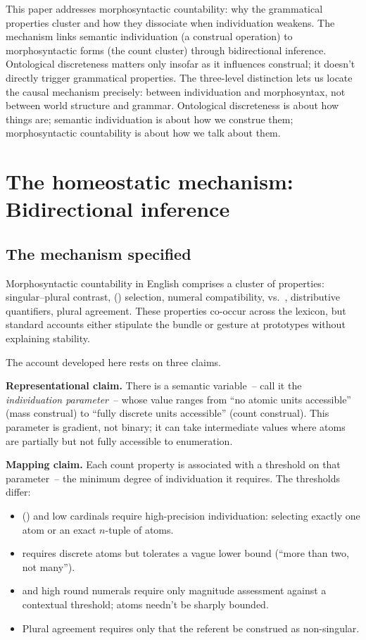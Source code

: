 \documentclass[12pt,a4paper]{article}
\begin{document}
This paper addresses morphosyntactic countability: why the grammatical properties cluster and how they dissociate when individuation weakens. The mechanism links semantic individuation (a construal operation) to morphosyntactic forms (the count cluster) through bidirectional inference. Ontological discreteness matters only insofar as it influences construal; it doesn't directly trigger grammatical properties. The three-level distinction lets us locate the causal mechanism precisely: between individuation and morphosyntax, not between world structure and grammar.
Ontological discreteness is about how things are; semantic individuation is about how we construe them; morphosyntactic countability is about how we talk about them.

\section{The homeostatic mechanism: Bidirectional inference}\label{sec:mechanism}

\subsection{The mechanism specified}\label{sec:mechanism-spec}

Morphosyntactic countability in English comprises a cluster of properties: singular--plural contrast, () selection, numeral compatibility,  vs.\ , distributive quantifiers, plural agreement. These properties co-occur across the lexicon, but standard accounts either stipulate the bundle or gesture at prototypes without explaining stability.

The account developed here rests on three claims.

\textbf{Representational claim.} There is a semantic variable~-- call it the \textit{individuation parameter}~-- whose value ranges from ``no atomic units accessible'' (mass construal) to ``fully discrete units accessible'' (count construal). This parameter is gradient, not binary; it can take intermediate values where atoms are partially but not fully accessible to enumeration.

\textbf{Mapping claim.} Each count property is associated with a threshold on that parameter~-- the minimum degree of individuation it requires. The thresholds differ:

\begin{itemize}
\item {}() and low cardinals require high-precision individuation: selecting exactly one atom or an exact $n$-tuple of atoms.
\item {} requires discrete atoms but tolerates a vague lower bound (``more than two, not many'').
\item {} and high round numerals require only magnitude assessment against a contextual threshold; atoms needn't be sharply bounded.
\item Plural agreement requires only that the referent be construed as non-singular.
\end{itemize}
\end{document}
